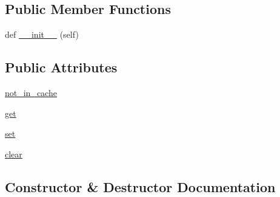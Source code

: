 \subsection*{Public Member Functions}
\begin{DoxyCompactItemize}
\item 
def \hyperlink{classpkg__resources_1_1__vendor_1_1pyparsing_1_1ParserElement_1_1__UnboundedCache_a885a63c42bf61339fe9eadd5c4915f18}{\+\_\+\+\_\+init\+\_\+\+\_\+} (self)
\end{DoxyCompactItemize}
\subsection*{Public Attributes}
\begin{DoxyCompactItemize}
\item 
\hyperlink{classpkg__resources_1_1__vendor_1_1pyparsing_1_1ParserElement_1_1__UnboundedCache_a843b5e99130ddcf1d13ba8103f600d1c}{not\+\_\+in\+\_\+cache}
\item 
\hyperlink{classpkg__resources_1_1__vendor_1_1pyparsing_1_1ParserElement_1_1__UnboundedCache_ae8177587a51373bc5004f924fb41fcb9}{get}
\item 
\hyperlink{classpkg__resources_1_1__vendor_1_1pyparsing_1_1ParserElement_1_1__UnboundedCache_ab14b775e21d6586cd1862f77238fca18}{set}
\item 
\hyperlink{classpkg__resources_1_1__vendor_1_1pyparsing_1_1ParserElement_1_1__UnboundedCache_af1ae77d5b307c5b656e7f236fc4a11e5}{clear}
\end{DoxyCompactItemize}


\subsection{Constructor \& Destructor Documentation}
\mbox{\label{classpkg__resources_1_1__vendor_1_1pyparsing_1_1ParserElement_1_1__UnboundedCache_a885a63c42bf61339fe9eadd5c4915f18}} 
